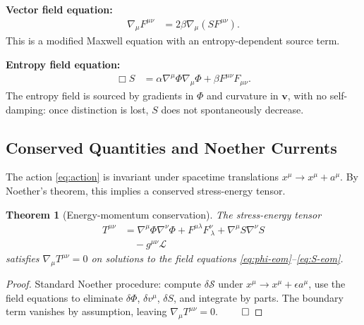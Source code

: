 \documentclass[12pt,a4paper,twoside,openright]{book}
\theoremstyle{plain}
\newtheorem{theorem}{Theorem}[chapter]
\theoremstyle{definition}
\theoremstyle{remark}
\newcommand{\vfield}{\bm{v}}
\newcommand{\Sfield}{S}
\newcommand{\Phifield}{\Phi}
\begin{document}
\textbf{Vector field equation:}
\begin{align}
\nabla_\mu F^{\mu\nu} &= 2\beta \nabla_\mu(\Sfield F^{\mu\nu}). \label{eq:v-eom}
\end{align}
This is a modified Maxwell equation with an entropy-dependent source term.

\textbf{Entropy field equation:}
\begin{align}
\Box \Sfield &= \alpha \nabla^\mu \Phifield \nabla_\mu \Phifield + \beta F^{\mu\nu}F_{\mu\nu}. \label{eq:S-eom}
\end{align}
The entropy field is sourced by gradients in $\Phifield$ and curvature in $\vfield$, with no self-damping: once distinction is lost, $\Sfield$ does not spontaneously decrease.

\subsection{Conserved Quantities and Noether Currents}

The action \eqref{eq:action} is invariant under spacetime translations $x^\mu \to x^\mu + a^\mu$. By Noether's theorem, this implies a conserved stress-energy tensor.

\begin{theorem}[Energy-momentum conservation]
The stress-energy tensor
\begin{align}
T^{\mu\nu} &= \nabla^\mu \Phifield \nabla^\nu \Phifield + F^{\mu\lambda} F^\nu_{\ \lambda} + \nabla^\mu \Sfield \nabla^\nu \Sfield \nonumber \\
&\quad - g^{\mu\nu} \mathcal{L}
\end{align}
satisfies $\nabla_\mu T^{\mu\nu} = 0$ on solutions to the field equations \eqref{eq:phi-eom}--\eqref{eq:S-eom}.
\end{theorem}

\begin{proof}
Standard Noether procedure: compute $\delta \mathcal{S}$ under $x^\mu \to x^\mu + \epsilon a^\mu$, use the field equations to eliminate $\delta \Phifield$, $\delta v^\mu$, $\delta \Sfield$, and integrate by parts. The boundary term vanishes by assumption, leaving $\nabla_\mu T^{\mu\nu} = 0$. $\qed$
\end{proof}
\end{document}
